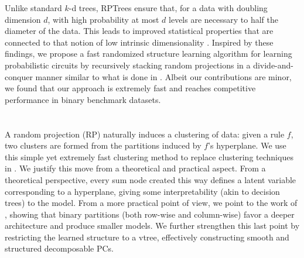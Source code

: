 Unlike standard $k$-d trees, RPTrees ensure that, for a data with doubling dimension $d$, with high
probability at most $d$ levels are necessary to half the diameter of the data. This leads to
improved statistical properties that are connected to that notion of low intrinsic dimensionality
\citep{dasgupta08b,dhesi10}. Inspired by these findings, we propose a fast randomized structure
learning algorithm for learning probabilistic circuits by recursively stacking random projections
in a divide-and-conquer manner similar to what is done in . Albeit our
contributions are minor, we found that our approach is extremely fast and reaches competitive
performance in binary benchmark datasets.

\section{}

A random projection (RP) naturally induces a clustering of data: given a rule $f$, two clusters are
formed from the partitions induced by $f$'s hyperplane. We use this simple yet extremely fast
clustering method to replace clustering techniques in . We justify this move
from a theoretical and practical aspect. From a theoretical perspective, every sum node created
this way defines a latent variable corresponding to a hyperplane, giving some interpretability
(akin to decision trees) to the model. From a more practical point of view, we point to the work
of \citet{vergari15}, showing that binary partitions (both row-wise and column-wise) favor a deeper
architecture and produce smaller models. We further strengthen this last point by restricting the
learned structure to a vtree, effectively constructing smooth and structured decomposable PCs.

